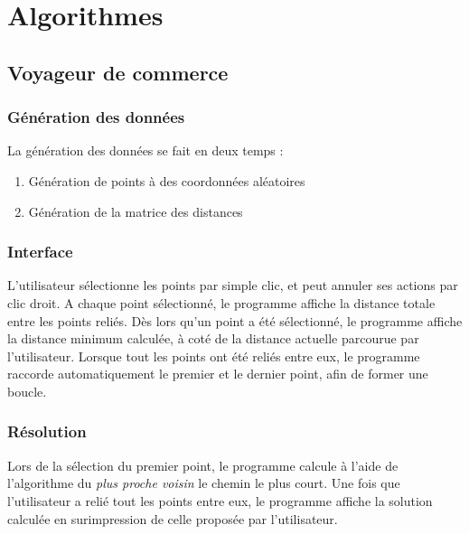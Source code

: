 \section{Algorithmes}
    \subsection{Voyageur de commerce}
        \subsubsection{Génération des données}
            La génération des données se fait en deux temps :
            \begin{enumerate}
                \item Génération de points à des coordonnées aléatoires
                \item Génération de la matrice des distances
            \end{enumerate}
        \subsubsection{Interface}
            L'utilisateur sélectionne les points par simple clic,
            et peut annuler ses actions par clic droit.
            A chaque point sélectionné, le programme
            affiche la distance totale entre les points reliés.
            Dès lors qu'un point a été sélectionné, le programme
            affiche la distance minimum calculée, à coté de
            la distance actuelle parcourue par l'utilisateur.
            Lorsque tout les points ont été reliés entre eux,
            le programme raccorde automatiquement le premier
            et le dernier point, afin de former une boucle.
        \subsubsection{Résolution}
            Lors de la sélection du premier point,
            le programme calcule à l'aide de l'algorithme
            du \emph{plus proche voisin} le chemin le plus court.
            Une fois que l'utilisateur a relié tout les points
            entre eux, le programme affiche la solution calculée
            en surimpression de celle proposée par l'utilisateur.
